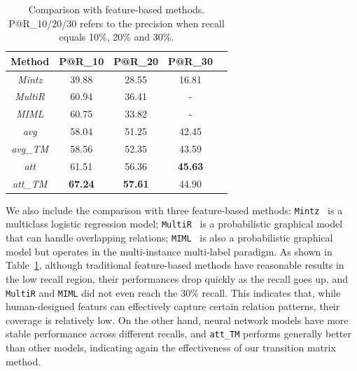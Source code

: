 \begin{table}
\centering
\small{
\begin{tabular}{|c|c|c|c|c|}
\hline
\textbf{Method}							& \textbf{P@R\_10} 		& \textbf{P@R\_20} 			& \textbf{P@R\_30} \\
\hline
\textit{Mintz} 							&39.88	&28.55	&16.81 	\\
\hline
\textit{MultiR} 						&60.94	&36.41	&- 	\\
\hline
\textit{MIML} 							&60.75	&33.82	&- 	\\
\hline
\textit{avg} 								&58.04	&51.25	&42.45 	\\
\hline
\textit{avg\_TM} 						&58.56	&52.35	&43.59 	\\
\hline
\textit{att} 								&61.51	&56.36	&\textbf{45.63} 	\\
\hline
\textit{att\_TM} 						&\textbf{67.24}	&\textbf{57.61}	&44.90 	\\
\hline
\end{tabular}
}
\caption{Comparison with feature-based methods. P@R\_10/20/30 refers to the precision when recall equals 10\%, 20\% and 30\%.}
\label{feature-based}
\end{table}

We also include the comparison with three feature-based methods: \texttt{Mintz}~\cite{mintz2009distant} is a multiclass logistic regression model; \texttt{MultiR}~\cite{hoffmann2011knowledge} is a probabilistic graphical model that can handle overlapping relations; \texttt{MIML}~\cite{surdeanu2012multi} is also a probabilistic graphical model but operates in the multi-instance multi-label paradigm. As shown in Table~\ref{feature-based}, although traditional feature-based methods have reasonable results in the low recall region, their performances drop quickly as the recall goes up,
and \texttt{MultiR} and \texttt{MIML} did not even reach the 30\% recall.
This indicates that, while human-designed featurs can effectively capture certain relation patterns, their coverage is relatively low.
On the other hand, neural network models have more stable performance across different recalls, 
and \texttt{att\_TM} performs generally better than other models, 
indicating again the effectiveness of our transition matrix method.






